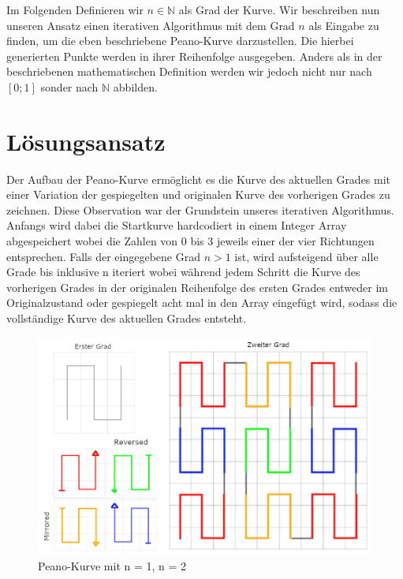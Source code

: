 \documentclass[course=asp]{aspdoc}
\begin{document}
Im Folgenden Definieren wir $n \in \mathbb{N}$ als Grad der Kurve.
Wir beschreiben nun unseren Ansatz einen iterativen Algorithmus mit dem Grad $n$ als Eingabe zu finden, um die eben beschriebene Peano-Kurve darzustellen. Die hierbei generierten Punkte werden in ihrer Reihenfolge ausgegeben. Anders als in der beschriebenen mathematischen Definition werden wir jedoch nicht nur nach $[0;1]$ sonder nach $\mathbb{N}$ abbilden.


\newpage

\section{L\"osungsansatz}
Der Aufbau der Peano-Kurve erm\"oglicht es die Kurve des aktuellen Grades mit einer Variation der gespiegelten und originalen Kurve des vorherigen Grades zu zeichnen.
Diese Observation war der Grundstein unseres iterativen Algorithmus. Anfangs wird dabei die Startkurve hardcodiert in einem Integer Array abgespeichert wobei die Zahlen von 0 bis 3 jeweils einer der vier Richtungen entsprechen. Falls der eingegebene Grad $n > 1$ ist, wird aufsteigend \"uber alle Grade bis inklusive n iteriert wobei w\"ahrend jedem Schritt die Kurve des vorherigen Grades in der originalen Reihenfolge des ersten Grades entweder im Originalzustand oder gespiegelt acht mal in den Array eingef\"ugt wird, sodass die vollst\"andige Kurve des aktuellen Grades entsteht. 

\begin{figure}[ht]
\centering
\includegraphics[scale=0.4]{PeanoFarbcodiert.png}
\caption{Peano-Kurve mit n = 1, n = 2}\label{Abb:Peano L\"osungsidee}
\end{figure}
\end{document}
